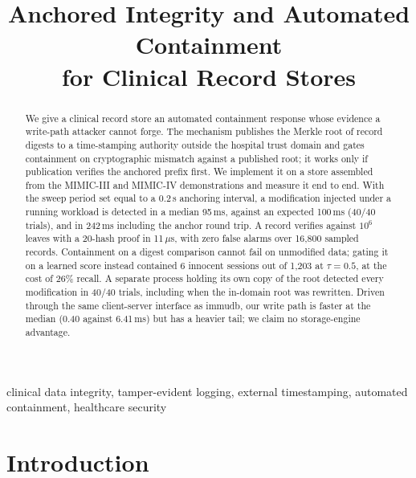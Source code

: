 \documentclass[conference]{IEEEtran}
\begin{document}
\title{Anchored Integrity and Automated Containment\\ for Clinical Record Stores}


\maketitle

\begin{abstract}
We give a clinical record store an automated containment response whose evidence a write-path
attacker cannot forge. The mechanism publishes the Merkle root of record digests to a
time-stamping authority outside the hospital trust domain and gates containment on cryptographic
mismatch against a published root; it works only if publication verifies the anchored prefix
first. We implement it on a store assembled from the MIMIC-III and MIMIC-IV demonstrations and
measure it end to end. With the sweep period set equal to a 0.2\,s anchoring interval, a
modification injected under a running workload is detected in a median 95\,ms, against an expected
100\,ms (40/40 trials), and in 242\,ms including the anchor round trip. A record verifies against
$10^6$ leaves with a 20-hash proof in 11\,$\mu$s, with zero false alarms over 16{,}800 sampled
records. Containment on a digest comparison cannot fail on unmodified data; gating it on a learned
score instead contained 6 innocent sessions out of 1{,}203 at $\tau=0.5$, at the cost of 26\%
recall. A separate process holding its own copy of the root detected every modification in 40/40
trials, including when the in-domain root was rewritten. Driven through the same client-server
interface as immudb, our write path is faster at the median (0.40 against 6.41\,ms) but has a
heavier tail; we claim no storage-engine advantage.
\end{abstract}

\begin{IEEEkeywords}
clinical data integrity, tamper-evident logging, external timestamping, automated
containment, healthcare security
\end{IEEEkeywords}

\section{Introduction}
\end{document}

